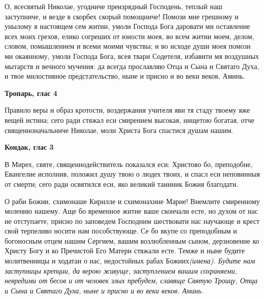 

\label{_content_svyatim-oputeshestvuyuchih}

 

 

О, всесвятый Николае, угодниче преизрядный Господень, теплый наш заступниче, и везде в скорбех скорый помощниче! Помози мне грешному и унылому в настоящем сем житии, умоли Господа Бога даровати ми оставление всех моих грехов, елико согреших от юности моея, во всем житии моем, делом, словом, помышлением и всеми моими чувствы; и во исходе души моея помози ми окаянному, умоли Господа Бога, всея твари Содетеля, избавити мя воздушных мытарств и вечного мучения: да всегда прославляю Отца и Сына и Святаго Духа, и твое милостивное предстательство, ныне и присно и во веки веков. Аминь.


\medskip


\bfseries Тропарь, глас 4\normalfont{}\nopagebreak


Правило веры и образ кротости, воздержания учителя яви тя стаду твоему яже вещей истина; сего ради стяжал еси смирением высокая, нищетою богатая, отче священноначальниче Николае, моли Христа Бога спастися душам нашим.


\medskip


\bfseries Кондак, глас 3\normalfont{}\nopagebreak


В Мирех, святе, священнодействитель показался еси: Христово бо, преподобне, Евангелие исполнив, положил душу твою о людех твоих, и спасл еси неповинныя от смерти; сего ради освятился еси, яко великий таинник Божия благодати. 
\nopagebreak\bigskip\bigskip\mychapterending

 


О раби Божии, схимонаше Кирилле и схимонахине Марие! Внемлите смиренному молению нашему. Аще бо временное житие ваше скончали есте, но духом от нас не отступаете, присно по заповедем Господним шествовати нас научающе и крест свой терпеливо носити нам пособствующе. Се бо вкупе со преподобным и богоносным отцем нашим Сергием, вашим возлюбленным сыном, дерзновение ко Христу Богу и ко Пречистой Его Матери стяжали есте. Темже и ныне будите молитвенницы и ходатаи о нас, недостойных рабах Божиих\itshape  (имена)\normalfont{}. Будите нам заступницы крепции, да верою живуще, заступлением вашим сохраняеми, невредими от бесов и от человек злых пребудем, славяще Святую Троицу, Отца и Сына и Святаго Духа, ныне и присно и во веки веков. Аминь. 
\nopagebreak\bigskip\bigskip\mychapterending


